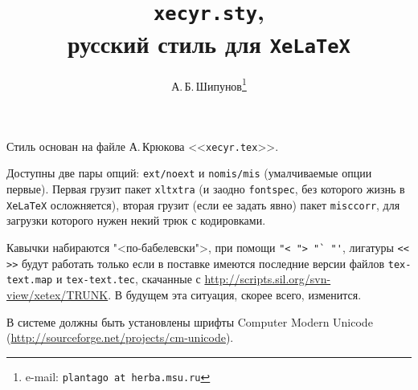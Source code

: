 \documentclass{article}
\author{А.\,Б.\,Шипунов\footnote{e-mail: \texttt{plantago at
herba.msu.ru}}}
\title{\texttt{xecyr.sty},\\ русский стиль для \texttt{XeLaTeX}}
\date{}
\begin{document}
\maketitle

Стиль основан на файле А.\,Крюкова <<\texttt{xecyr.tex}>>.

Доступны две пары опций: \texttt{ext/noext} и \texttt{nomis/mis}
(умалчиваемые опции первые). Первая грузит пакет \texttt{xltxtra} (и
заодно \texttt{fontspec}, без которого жизнь в \texttt{XeLaTeX} осложняется),
вторая грузит (если ее задать явно) пакет \texttt{misccorr}, для загрузки
которого нужен некий трюк с кодировками.

Кавычки набираются "<по-бабелевски">, при помощи \verb|"< "> "` "'|,
лигатуры \verb|<< >>| будут работать только если в поставке имеются
последние версии файлов \texttt{tex-text.map} и \texttt{tex-text.tec},
скачанные с \url{http://scripts.sil.org/svn-view/xetex/TRUNK}. В будущем
эта ситуация, скорее всего, изменится.

В системе должны быть
установлены шрифты Computer Modern Unicode
(\url{http://sourceforge.net/projects/cm-unicode}).
\end{document}
